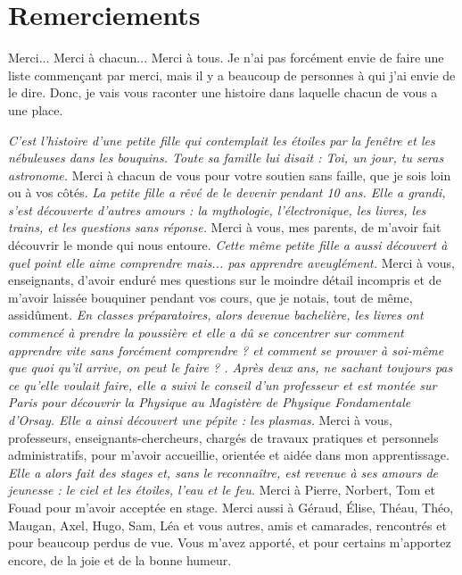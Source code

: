 \chapter{Remerciements}

Merci... Merci à chacun... Merci à tous.
Je n'ai pas forcément envie de faire une liste commençant par merci, mais il y a beaucoup de personnes à qui j'ai envie de le dire. Donc, je vais vous raconter une histoire dans laquelle chacun de vous a une place. 

{\it C'est l'histoire d'une petite fille qui contemplait les étoiles par la fenêtre et les nébuleuses dans les bouquins. Toute sa famille lui disait : \og Toi, un jour, tu seras astronome\fg{}.} Merci à chacun de vous pour votre soutien sans faille, que je sois loin ou à vos côtés. {\it La petite fille a rêvé de le devenir pendant 10 ans. Elle a grandi, s'est découverte d'autres amours : la mythologie, l'électronique, les livres, les trains, et les questions sans réponse.} Merci à vous, mes parents, de m'avoir fait découvrir le monde qui nous entoure. {\it Cette même petite fille a aussi découvert à quel point elle aime comprendre mais... pas apprendre aveuglément.} Merci à vous, enseignants, d'avoir enduré mes questions sur le moindre détail incompris et de m'avoir laissée bouquiner pendant vos cours, que je notais, tout de même, assidûment. {\it En classes préparatoires, alors devenue bachelière, les livres ont commencé à prendre la poussière et elle a dû se concentrer sur \og comment apprendre vite sans forcément comprendre ?\fg{} et \og comment se prouver à soi-même que quoi qu'il arrive, on peut le faire ? \fg{}. Après deux ans, ne sachant toujours pas ce qu'elle voulait faire, elle a suivi le conseil d'un professeur et est montée sur Paris pour découvrir la Physique au Magistère de Physique Fondamentale d'Orsay. Elle a ainsi découvert une pépite : les plasmas.} Merci à vous, professeurs, enseignants-chercheurs, chargés de travaux pratiques et personnels administratifs, pour m'avoir accueillie, orientée et aidée dans mon apprentissage. {\it Elle a alors fait des stages et, sans le reconnaître, est revenue à ses amours de jeunesse : le ciel et les étoiles, l'eau et le feu.} Merci à Pierre, Norbert, Tom et Fouad pour m'avoir acceptée en stage. Merci aussi à Géraud, Élise, Théau, Théo, Maugan, Axel, Hugo, Sam, Léa et vous autres, amis et camarades, rencontrés et pour beaucoup perdus de vue. Vous m'avez apporté, et pour certains m'apportez encore, de la joie et de la bonne humeur. 

